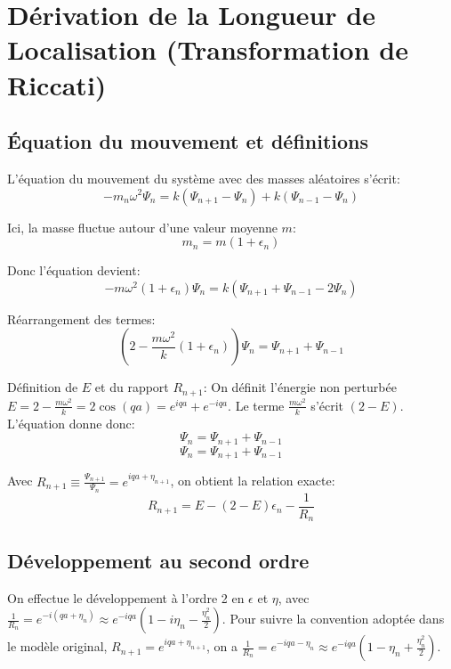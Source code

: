 \section{Dérivation de la Longueur de Localisation (Transformation de Riccati)}\label{annexe:lyapunov-derivation}

\subsection{Équation du mouvement et définitions}
L'équation du mouvement du système avec des masses aléatoires s'écrit:
\begin{equation*}
    -m_n\omega^2 \Psi_n = k(\Psi_{n+1} - \Psi_n) + k(\Psi_{n-1} - \Psi_n)
\end{equation*}

Ici, la masse fluctue autour d'une valeur moyenne $m$:
\begin{equation*}
    m_n = m(1+\epsilon_n)
\end{equation*}

Donc l'équation devient:
\begin{equation*}
    -m\omega^2(1+\epsilon_n) \Psi_n = k(\Psi_{n+1} + \Psi_{n-1} - 2\Psi_n)
\end{equation*}

Réarrangement des termes:
\begin{equation*}
    \left( 2 - \frac{m\omega^2}{k}(1+\epsilon_n) \right) \Psi_n = \Psi_{n+1} + \Psi_{n-1}
\end{equation*}

Définition de $E$ et du rapport $R_{n+1}$:
On définit l'énergie non perturbée $E = 2 - \frac{m\omega^2}{k} = 2 \cos(qa) = e^{iqa} + e^{-iqa}$.
Le terme $\frac{m\omega^2}{k}$ s'écrit $(2-E)$. L'équation donne donc:
\begin{equation*}
    [ 2 - (2-E)(1+\epsilon_n) ] \Psi_n = \Psi_{n+1} + \Psi_{n-1}
\end{equation*}
\begin{equation*}
    [ E - (2-E)\epsilon_n ] \Psi_n = \Psi_{n+1} + \Psi_{n-1}
\end{equation*}

Avec $R_{n+1} \equiv \frac{\Psi_{n+1}}{\Psi_n} = e^{iqa + \eta_{n+1}}$, on obtient la relation exacte:
\begin{equation*}
    R_{n+1} = E - (2-E)\epsilon_n - \frac{1}{R_n}
\end{equation*}

\subsection{Développement au second ordre}
On effectue le développement à l'ordre 2 en $\epsilon$ et $\eta$, avec $\frac{1}{R_n} = e^{-i(qa+\eta_n)} \approx e^{-iqa}(1 - i\eta_n - \frac{\eta_n^2}{2})$.
Pour suivre la convention adoptée dans le modèle original, $R_{n+1} = e^{iqa + \eta_{n+1}}$, on a $\frac{1}{R_n} = e^{-iqa-\eta_n} \approx e^{-iqa}(1 - \eta_n + \frac{\eta_n^2}{2})$.

